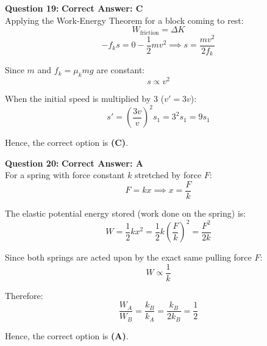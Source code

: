 \documentclass[11pt,a4paper]{article}
\begin{document}
\begin{tcolorbox}[solbox]
\textbf{\textcolor{primaryDark}{Question 19:}} \hfill \textbf{\textcolor{l1Green}{Correct Answer: C}}\\
\vspace{4pt}
Applying the Work-Energy Theorem for a block coming to rest:
$$W_{\text{friction}} = \Delta K$$
$$-f_k s = 0 - \frac{1}{2}m v^2 \implies s = \frac{m v^2}{2 f_k}$$

Since $m$ and $f_k = \mu_k mg$ are constant:
$$s \propto v^2$$

When the initial speed is multiplied by $3$ ($v' = 3v$):
$$s' = \left(\frac{3v}{v}\right)^2 s_1 = 3^2 s_1 = 9 s_1$$

Hence, the correct option is \textbf{(C)}.
\end{tcolorbox}

\begin{tcolorbox}[solbox]
\textbf{\textcolor{primaryDark}{Question 20:}} \hfill \textbf{\textcolor{l1Green}{Correct Answer: A}}\\
\vspace{4pt}
For a spring with force constant $k$ stretched by force $F$:
$$F = kx \implies x = \frac{F}{k}$$

The elastic potential energy stored (work done on the spring) is:
$$W = \frac{1}{2}kx^2 = \frac{1}{2}k\left(\frac{F}{k}\right)^2 = \frac{F^2}{2k}$$

Since both springs are acted upon by the exact same pulling force $F$:
$$W \propto \frac{1}{k}$$

Therefore:
$$\frac{W_A}{W_B} = \frac{k_B}{k_A} = \frac{k_B}{2k_B} = \frac{1}{2}$$

Hence, the correct option is \textbf{(A)}.
\end{tcolorbox}
\end{document}

